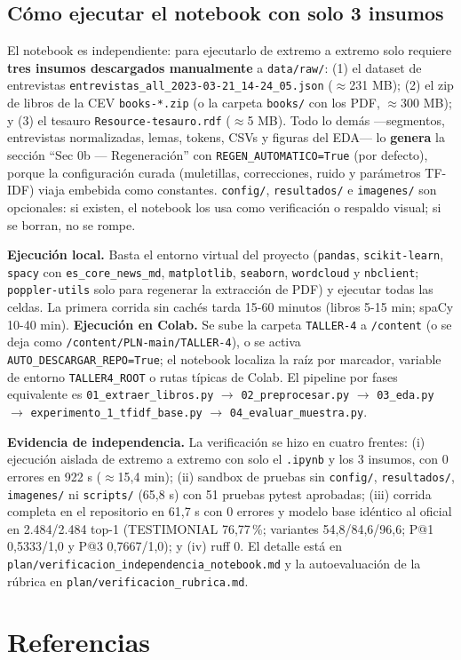 \documentclass[11pt]{tg_usta}
\begin{document}
\subsection{Cómo ejecutar el notebook con solo 3 insumos}

El notebook es independiente: para ejecutarlo de extremo a extremo solo requiere \textbf{tres insumos descargados manualmente} a \texttt{data/raw/}: (1) el dataset de entrevistas \texttt{entrevistas\_all\_2023-03-21\_14-24\_05.json} ($\approx$231 MB); (2) el zip de libros de la CEV \texttt{books-*.zip} (o la carpeta \texttt{books/} con los PDF, $\approx$300 MB); y (3) el tesauro \texttt{Resource-tesauro.rdf} ($\approx$5 MB). Todo lo demás ---segmentos, entrevistas normalizadas, lemas, tokens, CSVs y figuras del EDA--- lo \textbf{genera} la sección ``Sec 0b --- Regeneración'' con \texttt{REGEN\_AUTOMATICO=True} (por defecto), porque la configuración curada (muletillas, correcciones, ruido y parámetros TF-IDF) viaja embebida como constantes. \texttt{config/}, \texttt{resultados/} e \texttt{imagenes/} son opcionales: si existen, el notebook los usa como verificación o respaldo visual; si se borran, no se rompe.

\textbf{Ejecución local.} Basta el entorno virtual del proyecto (\texttt{pandas}, \texttt{scikit-learn}, \texttt{spacy} con \texttt{es\_core\_news\_md}, \texttt{matplotlib}, \texttt{seaborn}, \texttt{wordcloud} y \texttt{nbclient}; \texttt{poppler-utils} solo para regenerar la extracción de PDF) y ejecutar todas las celdas. La primera corrida sin cachés tarda 15-60 minutos (libros 5-15 min; spaCy 10-40 min). \textbf{Ejecución en Colab.} Se sube la carpeta \texttt{TALLER-4} a \texttt{/content} (o se deja como \texttt{/content/PLN-main/TALLER-4}), o se activa \texttt{AUTO\_DESCARGAR\_REPO=True}; el notebook localiza la raíz por marcador, variable de entorno \texttt{TALLER4\_ROOT} o rutas típicas de Colab. El pipeline por fases equivalente es \texttt{01\_extraer\_libros.py} $\rightarrow$ \texttt{02\_preprocesar.py} $\rightarrow$ \texttt{03\_eda.py} $\rightarrow$ \texttt{experimento\_1\_tfidf\_base.py} $\rightarrow$ \texttt{04\_evaluar\_muestra.py}.

\textbf{Evidencia de independencia.} La verificación se hizo en cuatro frentes: (i) ejecución aislada de extremo a extremo con solo el \texttt{.ipynb} y los 3 insumos, con 0 errores en 922 s ($\approx$15,4 min); (ii) sandbox de pruebas sin \texttt{config/}, \texttt{resultados/}, \texttt{imagenes/} ni \texttt{scripts/} (65,8 s) con 51 pruebas pytest aprobadas; (iii) corrida completa en el repositorio en 61,7 s con 0 errores y modelo base idéntico al oficial en 2.484/2.484 top-1 (TESTIMONIAL 76,77\,\%; variantes 54,8/84,6/96,6; P@1 0,5333/1,0 y P@3 0,7667/1,0); y (iv) ruff 0. El detalle está en \texttt{plan/verificacion\_independencia\_notebook.md} y la autoevaluación de la rúbrica en \texttt{plan/verificacion\_rubrica.md}.


\section{Referencias}

\nocite{*}

\newpage

\end{document}
